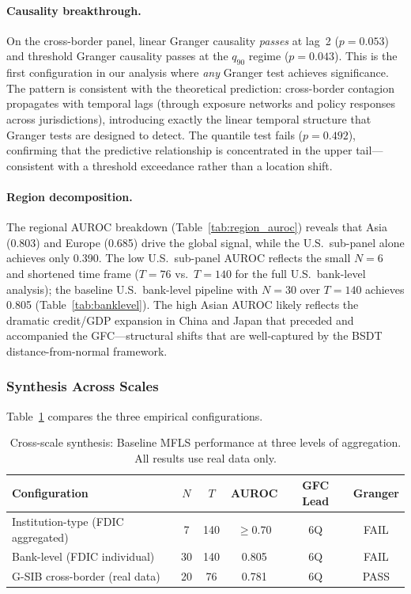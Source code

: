 \documentclass[11pt]{article}
\theoremstyle{definition}
\begin{document}
\paragraph{Causality breakthrough.}
On the cross-border panel, linear Granger causality \emph{passes} at lag~2
($p = 0.053$) and threshold Granger causality passes at the $q_{90}$ regime
($p = 0.043$).  This is the first configuration in our analysis where
\emph{any} Granger test achieves significance.  The pattern is consistent
with the theoretical prediction: cross-border contagion propagates with
temporal lags (through exposure networks and policy responses across
jurisdictions), introducing exactly the linear temporal structure that Granger
tests are designed to detect.  The quantile test fails ($p = 0.492$),
confirming that the predictive relationship is concentrated in the upper
tail---consistent with a threshold exceedance rather than a location shift.

\paragraph{Region decomposition.}
The regional AUROC breakdown (Table~\ref{tab:region_auroc}) reveals that Asia
(0.803) and Europe (0.685) drive the global signal, while the U.S.\ sub-panel
alone achieves only 0.390.  The low U.S.\ sub-panel AUROC reflects the
small $N=6$ and shortened time frame ($T=76$ vs.\ $T=140$ for the full
U.S.\ bank-level analysis); the baseline U.S.\ bank-level pipeline with
$N=30$ over $T=140$ achieves 0.805 (Table~\ref{tab:banklevel}).  The high
Asian AUROC likely reflects the dramatic credit/GDP expansion in China and
Japan that preceded and accompanied the GFC---structural shifts that are
well-captured by the BSDT distance-from-normal framework.

\subsubsection{Synthesis Across Scales}

Table~\ref{tab:synthesis} compares the three empirical configurations.

\begin{table}[htbp]
\centering
\caption{Cross-scale synthesis: Baseline MFLS performance at three levels of aggregation.
All results use real data only.}
\label{tab:synthesis}
\begin{tabular}{lccccc}
\toprule
Configuration & $N$ & $T$ & AUROC & GFC Lead & Granger \\
\midrule
Institution-type (FDIC aggregated) & 7  & 140 & $\geq 0.70$ & 6Q & FAIL \\
Bank-level (FDIC individual)       & 30 & 140 & 0.805       & 6Q & FAIL \\
G-SIB cross-border (real data)     & 20 &  76 & 0.781       & 6Q & PASS \\
\bottomrule
\end{tabular}
\end{table}
\end{document}
